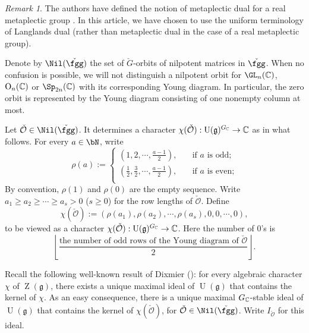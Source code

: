 \documentclass[12pt,a4paper]{amsart}
\newcommand{\CO}{{\mathcal {O}}}
\newcommand{\oO}{\operatorname{O}}
\newcommand{\oZ}{\operatorname{Z}}
\newcommand{\oU}{\operatorname{U}}
\newcommand{\g}{\mathfrak g}
\newcommand{\be}{\begin {equation}}
\newcommand{\ee}{\end {equation}}
\numberwithin{equation}{section}
\theoremstyle{remark}
\newtheorem*{remark}{Remark}
\begin{document}
\begin{remark} The authors have defined the notion of metaplectic dual for a real metaplectic group \cite{BMSZ1}. In this article, we have chosen to use the uniform terminology of Langlands dual (rather than metaplectic dual in the case of a real metaplectic group).
\end{remark}

Denote by $\Nil(\check \fgg)$ the set of   $\check G$-orbits  of nilpotent matrices in $\check \fgg$.
When no confusion is possible, we will not distinguish a nilpotent orbit for $\GL_n(\C)$, $\oO_n(\C)$ or $\Sp_{2n}(\C)$ with its corresponding Young diagram. In particular, the zero orbit is represented by the Young diagram consisting of one nonempty column at most.

Let  $\check \CO \in \Nil(\check \fgg) $.  It determines a character $\chi(\check \CO): \oU(\g)^{G_\C}\rightarrow \C$ as in what follows. For every  $a\in \bN$, write
\[
  \rho(a):=\left\{ \begin{array}{ll}
                  (1, 2, \cdots, \frac{a-1}{2}), \quad &\textrm{if $a$ is odd;}\\
                    (\frac{1}{2}, \frac{3}{2}, \cdots, \frac{a-1}{2}), \quad &\textrm{if $a$ is even;}\\
                    \end{array}
                 \right.
\]
By convention, $\rho(1)$ and $\rho(0)$ are  the empty sequence.
Write $a_1\geq  a_2\geq \cdots\geq a_s>0$ ($s\geq 0$)  for the row lengths of  $\check \CO$. Define
\be\label{chico}
 \chi(\check \CO):= (\rho( a_1), \rho(a_2),  \cdots, \rho(a_s), 0, 0, \cdots, 0 ),
\ee
to be viewed as a character $\chi(\check \CO): \oU(\g)^{G_\C}\rightarrow \C$.
Here the number of $0$'s is
\[
 \left\lfloor\frac{\textrm{the number of odd rows of the Young diagram of $\check \CO$}}{2}\right\rfloor.
\]


Recall the following well-known result of Dixmier (\cite[Section 3]{Bor}): for every algebraic character $\chi$ of $\oZ(\g)$, there exists a unique maximal ideal of $\oU(\g)$ that contains the kernel of $\chi$. %
As an easy consequence, there is a unique maximal $G_{\mathbb{C}}$-stable ideal of $\oU(\g)$ that contains the kernel of $\chi(\check \CO)$, for $\check \CO \in \Nil(\check \fgg)$. Write $I_{\check \CO}$ for this ideal.
\end{document}
